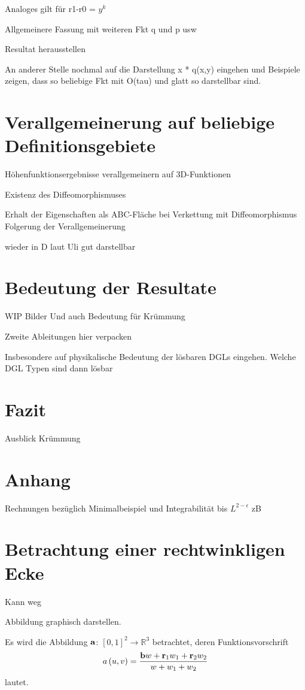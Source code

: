 \documentclass[10pt,a4paper,oneside]{report}
\newcommand{\R}{\mathbb{R}}
\begin{document}
Analoges gilt für r1-r0 = $y^k$

Allgemeinere Fassung mit weiteren Fkt q und p usw

Resultat herausstellen

An anderer Stelle nochmal auf die Darstellung x * q(x,y) eingehen und Beispiele zeigen, dass so beliebige Fkt mit O(tau) und glatt so darstellbar sind.

\chapter{Verallgemeinerung auf beliebige Definitionsgebiete}
Höhenfunktionsergebnisse verallgemeinern auf 3D-Funktionen

Existenz des Diffeomorphismuses

Erhalt der Eigenschaften als ABC-Fläche bei Verkettung mit Diffeomorphismus
Folgerung der Verallgemeinerung

wieder in D
laut Uli gut darstellbar

\chapter{Bedeutung der Resultate}
WIP
Bilder
Und auch Bedeutung für Krümmung

Zweite Ableitungen hier verpacken

Insbesondere auf physikalische Bedeutung der lösbaren DGLs eingehen. Welche DGL Typen sind dann lösbar

\chapter{Fazit}
Ausblick Krümmung


\chapter{Anhang}
Rechnungen bezüglich Minimalbeispiel und Integrabilität bis $L^{2-\epsilon}$ zB

\chapter{Betrachtung einer rechtwinkligen Ecke}
Kann weg


Abbildung graphisch darstellen. 

Es wird die Abbildung $\bold{a}$: $\left[0,1\right]^2 \to \R^3$ betrachtet, deren Funktionsvorschrift 
\begin{align*}
a\left(u,v\right) = \frac{\bold{b} w + \bold{r}_1 w_1 + \bold{r}_2 w_2}{w+w_1+w_2}
\end{align*}
lautet.
\end{document}
